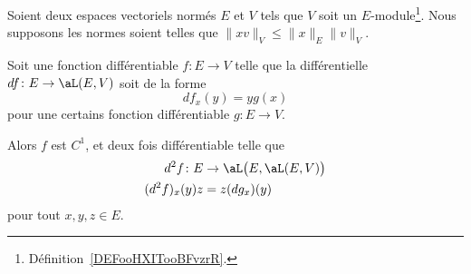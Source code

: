 \begin{lemma}
	Soient deux espaces vectoriels normés \( E\) et \( V\) tels que \( V\) soit un \( E\)-module\footnote{Définition~\ref{DEFooHXITooBFvzrR}.}. Nous supposons les normes soient telles que \( \| xv \|_{V}\leq \| x \|_E\| v \|_V\).

	Soit une fonction différentiable \( f\colon E\to V\) telle que la différentielle \( df\colon E\to \aL(E,V)\) soit de la forme
	\begin{equation}
		df_x(y)=yg(x)
	\end{equation}
	pour une certains fonction différentiable \( g\colon E\to V\).

	Alors \( f\) est \( C^1\), et deux fois différentiable telle que
	\begin{equation}
		\begin{aligned}
			d^2f\colon E & \to \aL\big( E,\aL(E,V) \big) \\
			(d^2f)_x(y)z & =z(dg_x)(y)
		\end{aligned}
	\end{equation}
	pour tout \( x,y,z\in E\).
\end{lemma}

